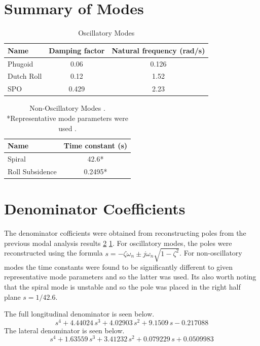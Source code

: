 \documentclass{article}
\begin{document}
\section{Summary of Modes}

\begin{table}[H]
  \centering
  \begin{tabular}{lcc}
      \toprule
      Name & Damping factor & Natural frequency (rad/s) \\
      \midrule
      Phugoid & 0.06 & 0.126 \\
      Dutch Roll & 0.12 & 1.52 \\
      SPO & 0.429 & 2.23 \\
      \bottomrule
  \end{tabular}
  \caption{Oscillatory Modes \cite{e2}}
    \label{tab:oscillatory_modes}
\end{table}

\begin{table}[H]
  \centering
  \begin{tabular}{lc}
      \toprule
      Name & Time constant (s) \\
      \midrule
      Spiral & 42.6* \\
      Roll Subsidence & 0.2495* \\
      \bottomrule
  \end{tabular}
  \caption{Non-Oscillatory Modes \cite{e2}. *Representative mode parameters were used \cite{rep}.}
  \label{tab:non_oscillatory_modes}
\end{table}

\section{Denominator Coefficients}

The denominator cofficients were obtained from reconstructing poles from the previous modal analysis results \ref{tab:non_oscillatory_modes} \ref{tab:oscillatory_modes}.
For oscillatory modes, the poles were reconstructed using the formula $s = -\zeta\omega_n \pm j\omega_n\sqrt{1-\zeta^2}$.
For non-oscillatory modes the time constants were found to be significantly different to given representative mode parameters \cite{rep} and so the latter was used.
Its also worth noting that the spiral mode is unstable and so the pole was placed in the right half plane $s = 1/42.6$.

The full longitudinal denominator is seen below. 
\begin{equation}
  s^4+4.44024\,s^3+4.02903\,s^2+9.1509\,s-0.217088
\end{equation}
The lateral denominator is seen below.
\begin{equation}
  s^4+1.63559\,s^3+3.41232\,s^2+0.079229\,s+0.0509983
\end{equation}
\end{document}
